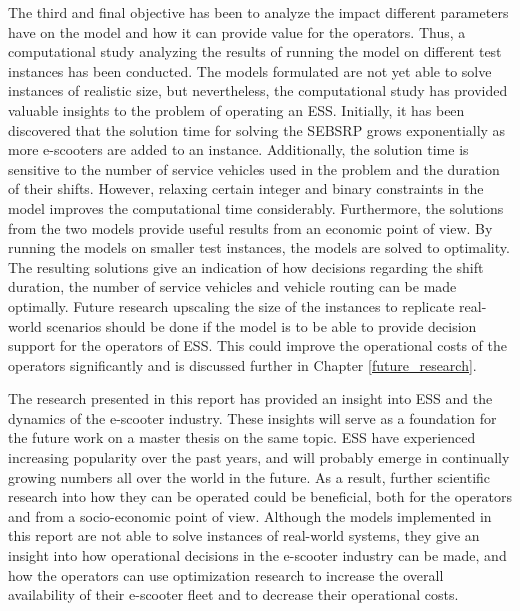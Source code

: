 The third and final objective has been to analyze the impact different parameters have on the model and how it can provide value for the operators.  Thus, a computational study analyzing the results of running the model on different test instances has been conducted.  The models formulated are not yet able to solve instances of realistic size, but nevertheless, the computational study has provided valuable insights to the problem of operating an ESS. Initially, it has been discovered that the solution time for solving the SEBSRP grows exponentially as more e-scooters are added to an instance. Additionally, the solution time is sensitive to the number of service vehicles used in the problem and the duration of their shifts. However, relaxing certain integer and binary constraints in the model improves the computational time considerably. Furthermore, the solutions from the two models provide useful results from an economic point of view. By running the models on smaller test instances, the models are solved to optimality. The resulting solutions give an indication of how decisions regarding the shift duration, the number of service vehicles and vehicle routing can be made optimally. Future research upscaling the size of the instances to replicate real-world scenarios should be done if the model is to be able to provide decision support for the operators of ESS. This could improve the operational costs of the operators significantly and is discussed further in Chapter \ref{future_research}.

The research presented in this report has provided an insight into ESS and the dynamics of the e-scooter industry. These insights will serve as a foundation for the future work on a master thesis on the same topic. ESS have experienced increasing popularity over the past years, and will probably emerge in continually growing numbers all over the world in the future. As a result, further scientific research into how they can be operated could be beneficial, both for the operators and from a socio-economic point of view. Although the models implemented in this report are not able to solve instances of real-world systems, they give an insight into how operational decisions in the e-scooter industry can be made, and how the operators can use optimization research to increase the overall availability of their e-scooter fleet and to decrease their operational costs. 

